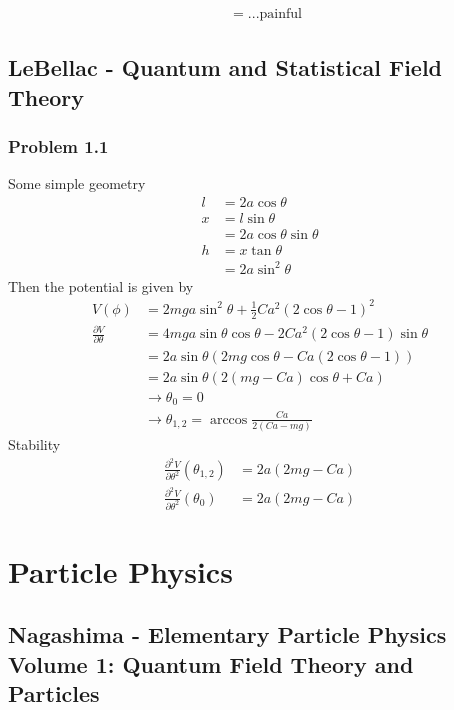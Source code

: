 \documentclass[10pt,a4paper]{article}
\theoremstyle{definition}
\begin{document}
\begin{align}
[M_{\mu\nu},M_{\rho,\sigma}]
&=...\text{painful}
\end{align}

\subsection{{\sc LeBellac} - Quantum and Statistical Field Theory}
\subsubsection{Problem 1.1}
Some simple geometry
\begin{align}
l&=2a\cos\theta\\
x&=l\sin\theta\\
&=2a\cos\theta\sin\theta\\
h&=x\tan\theta\\
&=2a\sin^2\theta
\end{align}
Then the potential is given by
\begin{align}
V(\phi)
&=2mga\sin^2\theta+\frac{1}{2}Ca^2(2\cos\theta-1)^2\\
\frac{\partial V}{\partial\theta}
&=4mga\sin\theta\cos\theta-2Ca^2(2\cos\theta-1)\sin\theta\\
&=2a\sin\theta\left(2mg\cos\theta-Ca(2\cos\theta-1)\right)\\
&=2a\sin\theta\left(2(mg-Ca)\cos\theta+Ca\right)\\
&\rightarrow\theta_0=0\\
&\rightarrow\theta_{1,2}=\arccos\frac{Ca}{2(Ca-mg)}
\end{align}
Stability
\begin{align}
\frac{\partial^2 V}{\partial\theta^2}(\theta_{1,2})
&=2a(2mg-Ca)\\
\frac{\partial^2 V}{\partial\theta^2}(\theta_{0})
&=2a(2mg-Ca)
\end{align}

\newpage
\section{Particle Physics}
\subsection{{\sc Nagashima} - Elementary Particle Physics Volume 1: Quantum Field Theory and Particles}
\end{document}
